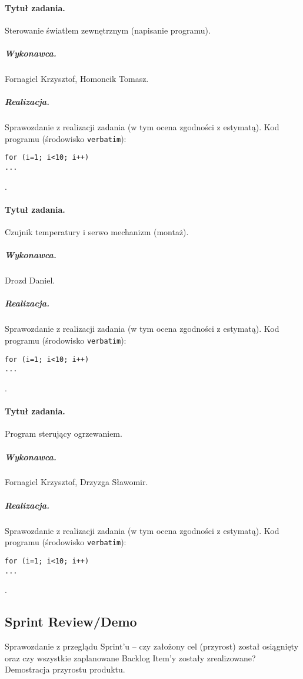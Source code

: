 \paragraph{Tytuł zadania.} Sterowanie światłem zewnętrznym (napisanie programu).
\subparagraph{Wykonawca.} Fornagiel Krzysztof, Homoncik Tomasz.
\subparagraph{Realizacja.} Sprawozdanie z realizacji zadania (w tym ocena zgodności z estymatą). Kod programu (środowisko \texttt{verbatim}): \begin{verbatim}
for (i=1; i<10; i++)
...
\end{verbatim}.

\paragraph{Tytuł zadania.} Czujnik temperatury i serwo mechanizm (montaż).
\subparagraph{Wykonawca.} Drozd Daniel.
\subparagraph{Realizacja.} Sprawozdanie z realizacji zadania (w tym ocena zgodności z estymatą). Kod programu (środowisko \texttt{verbatim}): \begin{verbatim}
for (i=1; i<10; i++)
...
\end{verbatim}.

\paragraph{Tytuł zadania.} Program sterujący ogrzewaniem.
\subparagraph{Wykonawca.} Fornagiel Krzysztof, Drzyzga Sławomir.
\subparagraph{Realizacja.} Sprawozdanie z realizacji zadania (w tym ocena zgodności z estymatą). Kod programu (środowisko \texttt{verbatim}): \begin{verbatim}
for (i=1; i<10; i++)
...
\end{verbatim}.


\subsection{Sprint Review/Demo}
Sprawozdanie z przeglądu Sprint'u -- czy założony cel (przyrost) został osiągnięty oraz czy wszystkie zaplanowane Backlog Item'y zostały zrealizowane? Demostracja przyrostu produktu.
